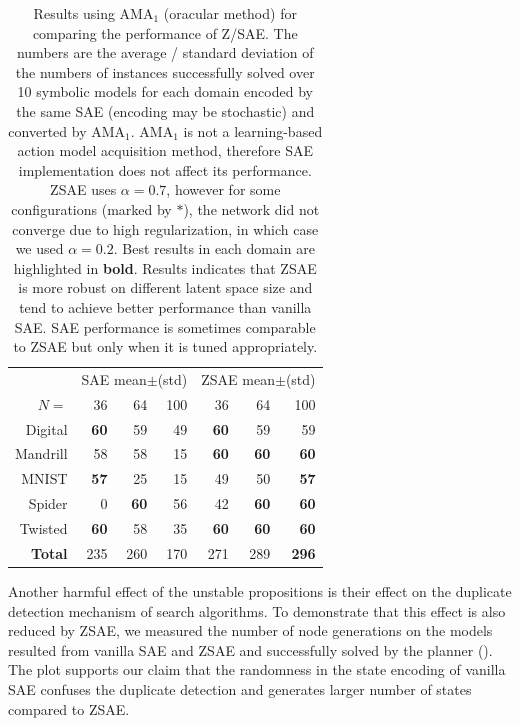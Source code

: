 \begin{table}[htbp]
\centering
\begin{tabular}{r|rrr|rrr}
 & \multicolumn{3}{c|}{SAE mean$\pm$(std)} & \multicolumn{3}{c}{ZSAE mean$\pm$(std)} \\ 
$N=$           & {36}        & {64}        & {100} & {36}        & {64}        & {100}        \\\hline
Digital        & \textbf{60} & 59          & 49    & \textbf{60} & 59          & 59           \\
Mandrill       & 58          & 58          & 15    & \textbf{60} & \textbf{60} & \textbf{60}  \\
MNIST          & \textbf{57} & 25          & 15    & 49          & 50          & \textbf{57}  \\
Spider         & 0           & \textbf{60} & 56    & 42          & \textbf{60} & \textbf{60}  \\
Twisted        & \textbf{60} & 58          & 35    & \textbf{60} & \textbf{60} & \textbf{60}  \\\hline
\textbf{Total} & {235}       & {260}       & {170} & {271}       & {289}       & \textbf{296} \\
\end{tabular}
\caption{Results using AMA$_1$ (oracular method) for comparing the performance of Z/SAE.
The numbers are the average / standard deviation of the numbers of instances successfully solved
 over 10 symbolic models for each domain encoded by the same SAE (encoding may be stochastic) and converted by AMA$_1$.
AMA$_1$ is not a learning-based action model acquisition method, therefore SAE implementation does not affect its performance.
ZSAE uses $\alpha=0.7$, however for some configurations (marked by $*$), the network did not converge due to high regularization, in which case we used $\alpha=0.2$.
Best results in each domain are highlighted in \textbf{bold}.
Results indicates that ZSAE is more robust on different latent space size and tend to achieve better performance than vanilla SAE.
SAE performance is sometimes comparable to ZSAE but only when it is tuned appropriately.
}
\label{tab:ama1}
\end{table}

Another harmful effect of the unstable propositions is
their effect on the duplicate detection mechanism of search algorithms.
To demonstrate that this effect is also reduced by ZSAE,
we measured the number of node generations
on the models resulted from vanilla SAE and ZSAE and successfully solved by
the planner ().
The plot supports our claim that
the randomness in the state encoding of vanilla SAE confuses the duplicate detection and
generates larger number of states compared to ZSAE.

